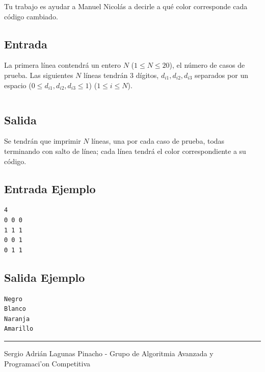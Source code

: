 \documentclass[letter,10pt]{article}
\newcommand{\lyxaddress}[1]{
\par {\raggedright #1
\vspace{1.4em}
\noindent\par}
}
\begin{document}
Tu trabajo es ayudar a Manuel Nicolás a decirle a qué color corresponde cada código cambiado.

\subsection*{Entrada}

La primera línea contendrá un entero $N$ ($1 \le N \le 20$), el número de casos de prueba. Las siguientes $N$ líneas tendrán 3 dígitos, $d_{i1} , d_{i2} , d_{i3}$ separados por un espacio ($0 \le d_{i1},d_{i2},d_{i3} \le 1$) ($1 \le i \le N$).

\newpage

$$$$$$$$$$$$
$$$$$$$$$$$$

\subsection*{Salida}

Se tendrán que imprimir $N$ líneas, una por cada caso de prueba, todas terminando con salto de línea; cada línea tendrá el color correspondiente a su código.




\subsection*{Entrada Ejemplo}
\begin{verbatim}
4
0 0 0
1 1 1
0 0 1
0 1 1

\end{verbatim}

\subsection*{Salida Ejemplo}

\begin{verbatim}
Negro
Blanco
Naranja
Amarillo

\end{verbatim}

\noindent \rule[0.5ex]{1\columnwidth}{1pt}


\lyxaddress{Sergio Adrián Lagunas Pinacho - Grupo de Algoritmia Avanzada y Programaci'on Competitiva}
\end{document}
